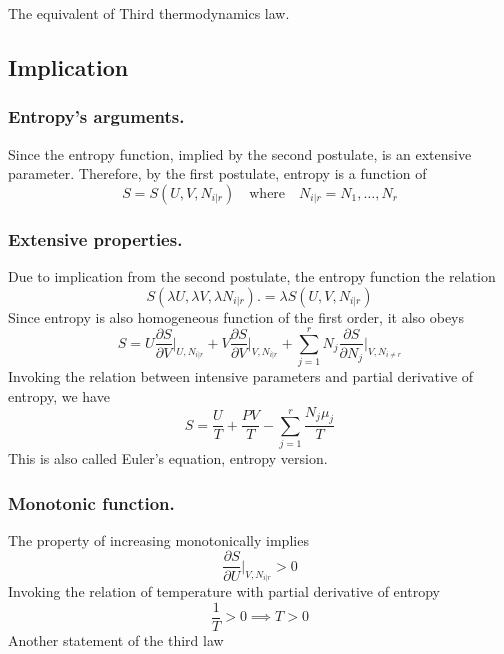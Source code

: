 \documentclass[../../../Main.tex]{subfiles}
\begin{document}
The equivalent of Third thermodynamics law.

\subsection{Implication}
\subsubsection{Entropy's arguments.} Since the entropy function, implied by the second postulate, is an extensive parameter. Therefore, by the first postulate, entropy is a function of 
\begin{equation*}
    S=S(U,V,N_{i|r})\quad\text{where}\quad N_{i|r}=N_1,\dots,N_r
\end{equation*}

\subsubsection{Extensive properties.} Due to implication from the second postulate, the entropy function the relation 
\begin{equation*}
    S(\lambda U, \lambda V, \lambda N_{i|r} ). = \lambda S(U, V, N_{i|r} )
\end{equation*}
Since entropy is also homogeneous function of the first order, it also obeys 
\begin{equation*}
    S=U\frac{\partial S}{\partial V}\bigg|_{U,N_{i|r}}+V\frac{\partial S}{\partial V}\bigg|_{V,N_{i|r}}+ \sum_{j=1}^{r} N_j\frac{\partial S}{\partial N_j}\bigg|_{V,N_{i\neq r}}
\end{equation*}
Invoking the relation between intensive parameters and partial derivative of entropy, we have 
\begin{equation*}
    S=\frac{U}{T}+\frac{PV}{T}-\sum_{j=1}^{r}\frac{N_j\mu_j}{T}
\end{equation*}
This is also called Euler's equation, entropy version.

\subsubsection{Monotonic function.} The property of increasing monotonically implies
\begin{equation*}
    \frac{\partial S}{\partial U}\bigg|_{V,N_{i|r}}>0
\end{equation*}
Invoking the relation of temperature with partial derivative of entropy
\begin{equation*}
    \frac{1}{T}>0\implies T>0
\end{equation*}
Another statement of the third law
\end{document}
